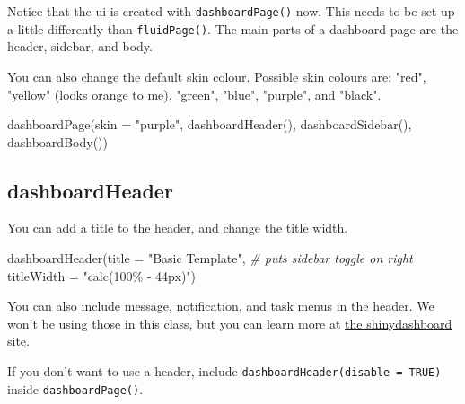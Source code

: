\documentclass[
  oneside]{book}
\newenvironment{Shaded}{\begin{snugshade}}{\end{snugshade}}
\newcommand{\AttributeTok}[1]{\textcolor[rgb]{0.77,0.63,0.00}{#1}}
\newcommand{\CommentTok}[1]{\textcolor[rgb]{0.56,0.35,0.01}{\textit{#1}}}
\newcommand{\FunctionTok}[1]{\textcolor[rgb]{0.00,0.00,0.00}{#1}}
\newcommand{\NormalTok}[1]{#1}
\newcommand{\StringTok}[1]{\textcolor[rgb]{0.31,0.60,0.02}{#1}}
\begin{document}
Notice that the ui is created with \texttt{dashboardPage}\texttt{()} now. This needs to be set up a little differently than \texttt{fluidPage}\texttt{()}. The main parts of a dashboard page are the header, sidebar, and body.

You can also change the default \AttributeTok{skin} colour. Possible skin colours are: \StringTok{"red"}, \StringTok{"yellow"} (looks orange to me), \StringTok{"green"}, \StringTok{"blue"}, \StringTok{"purple"}, and \StringTok{"black"}.

\begin{Shaded}
\begin{Highlighting}[]
\FunctionTok{dashboardPage}\NormalTok{(}\AttributeTok{skin =} \StringTok{"purple"}\NormalTok{,}
              \FunctionTok{dashboardHeader}\NormalTok{(),}
              \FunctionTok{dashboardSidebar}\NormalTok{(),}
              \FunctionTok{dashboardBody}\NormalTok{())}
\end{Highlighting}
\end{Shaded}

\hypertarget{dashboardheader}{%
\subsection{dashboardHeader}\label{dashboardheader}}

You can add a title to the header, and change the title width.

\begin{Shaded}
\begin{Highlighting}[]
\FunctionTok{dashboardHeader}\NormalTok{(}\AttributeTok{title =} \StringTok{"Basic Template"}\NormalTok{,}
                \CommentTok{\# puts sidebar toggle on right}
                \AttributeTok{titleWidth =} \StringTok{"calc(100\% {-} 44px)"}\NormalTok{)}
\end{Highlighting}
\end{Shaded}

You can also include message, notification, and task menus in the header. We won't be using those in this class, but you can learn more at \href{https://rstudio.github.io/shinydashboard/structure.html\#message-menus}{the shinydashboard site}.

\begin{info}
If you don't want to use a header, include \texttt{dashboardHeader(disable\ =\ TRUE)} inside \texttt{dashboardPage}\texttt{()}.

\end{info}
\end{document}
